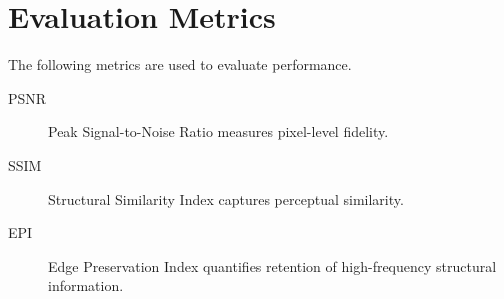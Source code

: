 \section{Evaluation Metrics}
\label{sec:metrics}

The following metrics are used to evaluate performance.

\begin{description}
  \item[PSNR] Peak Signal-to-Noise Ratio measures pixel-level fidelity.
  \item[SSIM] Structural Similarity Index captures perceptual similarity.
  \item[EPI] Edge Preservation Index quantifies retention of high-frequency
    structural information.
\end{description}
